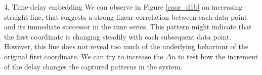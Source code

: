 \begin{task}{4, Time-delay embedding}
We can observe in Figure \ref{coor_d1b} an increasing straight line, that suggests a strong linear correlation between each data point and its immediate successor in the time series. This pattern might indicate that the first coordinate is changing steadily with each subsequent data point. However, this line does not reveal too much of the underlying behaviour of the original first coordinate. We can try to increase the \(\Delta n\) to test how the increment of the delay changes the captured patterns in the system.
\begin{figure}[H]
\centering
{}

\end{figure}
\end{task}
